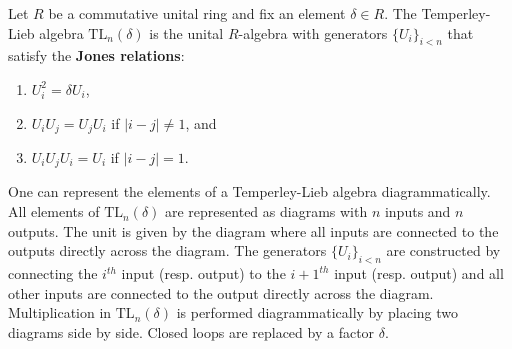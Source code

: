    \begin{example}
        Let $R$ be a commutative unital ring and fix an element $\delta\in R$. The Temperley-Lieb algebra $\mathrm{TL}_n(\delta)$ is the unital $R$-algebra with generators $\{U_i\}_{i<n}$ that satisfy the \textbf{Jones relations}:
        \begin{enumerate}
            \item $U_i^2 = \delta U_i$,
            \item $U_i U_j = U_j U_i$ if $|i-j|\neq 1$, and
            \item $U_i U_j U_i = U_i$ if $|i-j| = 1$.
        \end{enumerate}
        One can represent the elements of a Temperley-Lieb algebra diagrammatically. All elements of $\mathrm{TL}_n(\delta)$ are represented as diagrams with $n$ inputs and $n$ outputs. The unit is given by the diagram where all inputs are connected to the outputs directly across the diagram. The generators $\{U_i\}_{i<n}$ are constructed by connecting the $i^{th}$ input (resp. output) to the $i+1^{th}$ input (resp. output) and all other inputs are connected to the output directly across the diagram. Multiplication in $\text{TL}_n(\delta)$ is performed diagrammatically by placing two diagrams side by side. Closed loops are replaced by a factor $\delta$.


\end{example}
